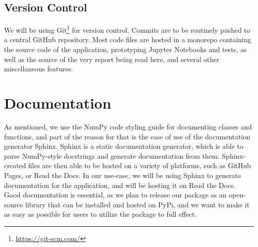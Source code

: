 \subsection{Version Control}

We will be using Git\footnote{\url{https://git-scm.com/}} for version control. Commits are to be routinely pushed to a central GitHub repository. Most code files are hosted in a monorepo containing the source code of the application, prototyping Jupyter Notebooks and tests, as well as the source of the very report being read here, and several other miscellaneous features. 


\section{Documentation}
As mentioned, we use the NumPy code styling guide for documenting classes and functions, and part of the reason for that is the ease of use of the documentation generator Sphinx. Sphinx is a static documentation generator, which is able to parse NumPy-style docstrings and generate documentation from them. Sphinx-created files are then able to be hosted on a variety of platforms, such as GitHub Pages, or Read the Docs. In our use-case, we will be using Sphinx to generate documentation for the application, and will be hosting it on Read the Docs. Good documentation is essential, as we plan to release our package as an open-source library that can be installed and hosted on PyPi, and we want to make it as easy as possible for users to utilize the package to full effect.